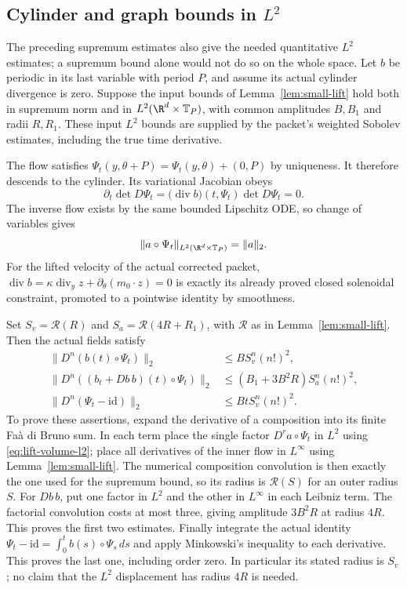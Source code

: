 \subsection{Cylinder and graph bounds in \texorpdfstring{$L^2$}{L2}}
The preceding supremum estimates also give the needed quantitative
$L^2$ estimates; a supremum bound alone would not do so on the whole
space. Let $b$ be periodic in its last variable with period $P$, and
assume its actual cylinder divergence is zero. Suppose the input bounds
of Lemma~\ref{lem:small-lift} hold both in supremum norm and in
$L^2(\R^d\times\mathbb T_P)$, with common amplitudes $B,B_1$ and
radii $R,R_1$. These input $L^2$ bounds are supplied by the packet's
weighted Sobolev estimates, including the true time derivative.

The flow satisfies
$\Psi_t(y,\theta+P)=\Psi_t(y,\theta)+(0,P)$ by uniqueness.
It therefore descends to the cylinder. Its variational Jacobian obeys
\[
 \partial_t\det D\Psi_t
       =\bigl(\operatorname{div}b\bigr)(t,\Psi_t)\det D\Psi_t=0.
\]
The inverse flow exists by the same bounded Lipschitz ODE, so change of
variables gives
\begin{equation}\label{eq:lift-volume-l2}
 \|a\circ\Psi_t\|_{L^2(\R^d\times\mathbb T_P)}=\|a\|_2.
\end{equation}
For the lifted velocity of the actual corrected packet,
$\operatorname{div}b=\kappa\operatorname{div}_y z+
\partial_\theta(m_0\cdot z)=0$ is exactly its already proved closed
solenoidal constraint, promoted to a pointwise identity by smoothness.

Set $S_v=\mathscr R(R)$ and $S_a=\mathscr R(4R+R_1)$, with
$\mathscr R$ as in Lemma~\ref{lem:small-lift}. Then the actual fields
satisfy
\begin{align}
 \|D^n(b(t)\circ\Psi_t)\|_2
    &\le B S_v^n(n!)^2,\label{eq:lift-velocity-l2}\\
 \|D^n((b_t+Db\,b)(t)\circ\Psi_t)\|_2
    &\le(B_1+3B^2R)S_a^n(n!)^2,\label{eq:lift-acceleration-l2}\\
 \|D^n(\Psi_t-\mathrm{id})\|_2
    &\le Bt S_v^n(n!)^2.\label{eq:lift-displacement-l2}
\end{align}
To prove these assertions, expand the derivative of a composition into
its finite Fa\`a di Bruno sum. In each term place the single factor
$D^r a\circ\Psi_t$ in $L^2$ using \eqref{eq:lift-volume-l2}; place
all derivatives of the inner flow in $L^\infty$ using
Lemma~\ref{lem:small-lift}. The numerical composition convolution is
then exactly the one used for the supremum bound, so its radius is
$\mathscr R(S)$ for an outer radius $S$. For $Db\,b$, put one factor
in $L^2$ and the other in $L^\infty$ in each Leibniz term.
The factorial convolution costs at most three, giving amplitude
$3B^2R$ at radius $4R$. This proves the first two estimates.
Finally integrate the actual identity
$\Psi_t-\mathrm{id}=\int_0^t b(s)\circ\Psi_s\,ds$ and apply
Minkowski's inequality to each derivative. This proves the last one,
including order zero. In particular its stated radius is $S_v$;
no claim that the $L^2$ displacement has radius $4R$ is needed.

